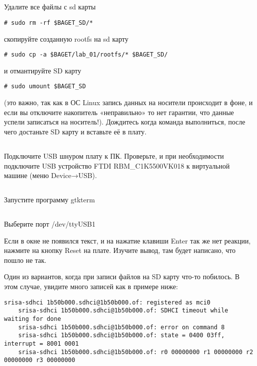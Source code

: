 \subsection{}Удалите все файлы с sd карты
\begin{lstlisting}[style=bash]
	# sudo rm -rf $BAGET_SD/*
\end{lstlisting}
скопируйте созданную rootfs на sd карту
\begin{lstlisting}[style=bash]
	# sudo cp -a $BAGET/lab_01/rootfs/* $BAGET_SD/
\end{lstlisting}
и отмантируйте SD карту 
\begin{lstlisting}[style=bash]
	# sudo umount $BAGET_SD
\end{lstlisting}
(это важно, так как в ОС Linux запись данных на носители происходит в фоне, и если вы отключите накопитель «неправильно» то нет гарантии, что данные успели записаться на носитель!).
Дождитесь когда команда выполниться, после чего достаньте SD карту и вставьте её в плату.

\subsection{}Подключите USB шнуром плату к ПК. Проверьте, и при необходимости подключите USB устройство FTDI RBM\_C1K5500VK018 к виртуальной машине (меню Device→USB).

\subsection{} Запустите программу gtkterm 

\subsection{} Выберите порт /dev/ttyUSB1 

Если в окне не появился текст, и на нажатие клавиши Enter так же нет реакции,  нажмите на кнопку Reset на плате. Изучите вывод, там будет написано, что пошло не так.

Один из вариантов, когда при записи файлов на SD карту что-то побилось. В этом случае, увидите много записей как в примере ниже:
\begin{lstlisting}[style=stdout]
	srisa-sdhci 1b50b000.sdhci@1b50b000.of: registered as mci0
	srisa-sdhci 1b50b000.sdhci@1b50b000.of: SDHCI timeout while waiting for done
	srisa-sdhci 1b50b000.sdhci@1b50b000.of: error on command 8
	srisa-sdhci 1b50b000.sdhci@1b50b000.of: state = 0400 03ff, interrupt = 8001 0001
	srisa-sdhci 1b50b000.sdhci@1b50b000.of: r0 00000000 r1 00000000 r2 00000000 r3 00000000
\end{lstlisting}

